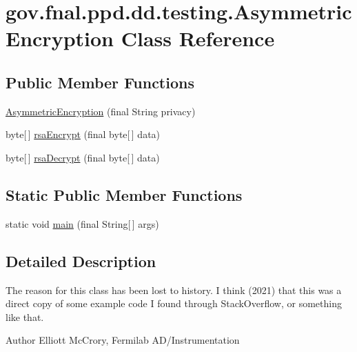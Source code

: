\hypertarget{classgov_1_1fnal_1_1ppd_1_1dd_1_1testing_1_1AsymmetricEncryption}{\section{gov.\-fnal.\-ppd.\-dd.\-testing.\-Asymmetric\-Encryption Class Reference}
\label{classgov_1_1fnal_1_1ppd_1_1dd_1_1testing_1_1AsymmetricEncryption}
}
\subsection*{Public Member Functions}
\begin{DoxyCompactItemize}
\item 
\hyperlink{classgov_1_1fnal_1_1ppd_1_1dd_1_1testing_1_1AsymmetricEncryption_a5272341af392c74c910ce0874523defe}{Asymmetric\-Encryption} (final String privacy)
\item 
byte\mbox{[}$\,$\mbox{]} \hyperlink{classgov_1_1fnal_1_1ppd_1_1dd_1_1testing_1_1AsymmetricEncryption_a3d19fa6b578aead37afe4328881fe467}{rsa\-Encrypt} (final byte\mbox{[}$\,$\mbox{]} data)
\item 
byte\mbox{[}$\,$\mbox{]} \hyperlink{classgov_1_1fnal_1_1ppd_1_1dd_1_1testing_1_1AsymmetricEncryption_ae076c4919f79815cebae79ca1b62066a}{rsa\-Decrypt} (final byte\mbox{[}$\,$\mbox{]} data)
\end{DoxyCompactItemize}
\subsection*{Static Public Member Functions}
\begin{DoxyCompactItemize}
\item 
static void \hyperlink{classgov_1_1fnal_1_1ppd_1_1dd_1_1testing_1_1AsymmetricEncryption_ae24fff0243749113cb3c1c4c348b8cc3}{main} (final String\mbox{[}$\,$\mbox{]} args)
\end{DoxyCompactItemize}


\subsection{Detailed Description}
The reason for this class has been lost to history. I think (2021) that this was a direct copy of some example code I found through Stack\-Overflow, or something like that.

\begin{DoxyAuthor}{Author}
Elliott Mc\-Crory, Fermilab A\-D/\-Instrumentation 
\end{DoxyAuthor}


